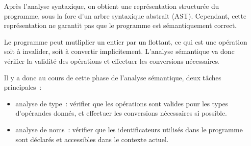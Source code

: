 Après l'analyse syntaxique, on obtient une représentation structurée du programme, sous la fore d'un arbre syntaxique abstrait (AST). Cependant, cette représentation ne garantit pas que le programme est sémantiquement correct. 


\begin{exemple}{}{}
Le programme peut mutliplier un entier par un flottant, ce qui est une opération soit à invalider, soit à convertir implicitement. L'analyse sémantique va donc vérifier la validité des opérations et effectuer les conversions nécessaires.
\end{exemple}

Il y a donc au cours de cette phase de l'analyse sémantique, deux tâches principales~:
\begin{itemize}
  \item analyse de type~: vérifier que les opérations sont valides pour les types d'opérandes donnés, et effectuer les conversions nécessaires si possible.
  \item analyse de noms~: vérifier que les identificateurs utilisés dans le programme sont déclarés et accessibles dans le contexte actuel.
\end{itemize}
